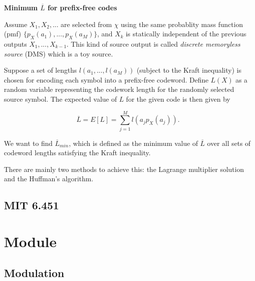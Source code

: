 \documentclass[titlepage]{article}
\numberwithin{figure}{section}
\numberwithin{equation}{section}
\begin{document}
\textbf{Minimum $\overline L$ for prefix-free codes}

Assume $X_{1}, X_{2}, ...$ are selected from $\chi$ using the same probablity mass function (pmf) $\{p_{X}(a_{1}), ..., p_{X}(a_{M})\}$, and $X_{k}$ is statically independent of the previous outputs $X_{1},...,X_{k-1}$. This kind of source output is called \textit{discrete memoryless source} (DMS) which is a toy source.

Suppose a set of lengths $l(a_{1},...,l(a_{M}))$ (subject to the Kraft inequality) is chosen for encoding each symbol into a prefix-free codeword. Define $L(X)$ as a random variable representing the codework length for the randomly selected source symbol. The expected value of $L$ for the given code is then given by 

\begin{displaymath}
	\overline L=E[L]=\sum_{j=1}^{M}l(a_{j}p_{X}(a_{j})).
\end{displaymath}

We want to find $\overline L_{min}$, which is defined as the minimum value of $\overline L$ over all sets of codeword lengths satisfying the Kraft inequality.

There are mainly two methods to achieve this: the Lagrange multiplier solution and the Huffman's algorithm.

\subsection{MIT 6.451}

\section{Module}

\subsection{Modulation}



\end{document}

